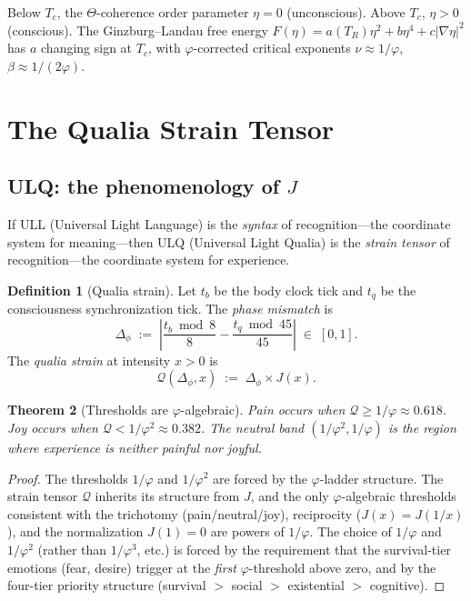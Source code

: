 \documentclass[11pt,a4paper]{article}
\theoremstyle{plain}
\newtheorem{theorem}{Theorem}[section]
\theoremstyle{definition}
\newtheorem{definition}[theorem]{Definition}
\theoremstyle{remark}
\newcommand{\Jcost}{J}
\newcommand{\vp}{\varphi}
\begin{document}
Below $T_c$, the $\Theta$-coherence order parameter $\eta = 0$
(unconscious).  Above $T_c$, $\eta > 0$ (conscious).  The Ginzburg--Landau
free energy $F(\eta) = a(T_R)\eta^2 + b\eta^4 + c|\nabla\eta|^2$
has $a$ changing sign at $T_c$, with $\vp$-corrected critical
exponents $\nu \approx 1/\vp$, $\beta \approx 1/(2\vp)$.

\section{The Qualia Strain Tensor}
\label{sec:qualia}

\subsection{ULQ: the phenomenology of $\Jcost$}

If ULL (Universal Light Language) is the \emph{syntax} of
recognition---the coordinate system for meaning---then ULQ
(Universal Light Qualia) is the \emph{strain tensor} of
recognition---the coordinate system for experience.

\begin{definition}[Qualia strain]
\label{def:strain}
Let $t_b$ be the body clock tick and $t_q$ be the consciousness
synchronization tick.  The \emph{phase mismatch} is
\begin{equation}
  \Delta_\phi \;:=\; \left|\frac{t_b \bmod 8}{8}
  - \frac{t_q \bmod 45}{45}\right| \;\in\; [0, 1].
\end{equation}
The \emph{qualia strain} at intensity $x > 0$ is
\begin{equation}
\label{eq:strain}
  \mathcal{Q}(\Delta_\phi, x) \;:=\;
  \Delta_\phi \times \Jcost(x).
\end{equation}
\end{definition}

\begin{theorem}[Thresholds are $\vp$-algebraic]
\label{thm:thresholds}
Pain occurs when $\mathcal{Q} \geq 1/\vp \approx 0.618$.
Joy occurs when $\mathcal{Q} < 1/\vp^2 \approx 0.382$.
The neutral band $(1/\vp^2, 1/\vp)$ is the region where
experience is neither painful nor joyful.
\end{theorem}

\begin{proof}
The thresholds $1/\vp$ and $1/\vp^2$ are forced by the $\vp$-ladder
structure.  The strain tensor $\mathcal{Q}$ inherits its structure
from $\Jcost$, and the only $\vp$-algebraic thresholds consistent
with the trichotomy (pain/neutral/joy), reciprocity
($\Jcost(x) = \Jcost(1/x)$), and the normalization
$\Jcost(1) = 0$ are powers of $1/\vp$.  The choice of $1/\vp$ and
$1/\vp^2$ (rather than $1/\vp^3$, etc.) is forced by the requirement
that the survival-tier emotions (fear, desire) trigger at the
\emph{first} $\vp$-threshold above zero, and by the four-tier
priority structure (survival $>$ social $>$ existential $>$ cognitive).
\end{proof}
\end{document}
